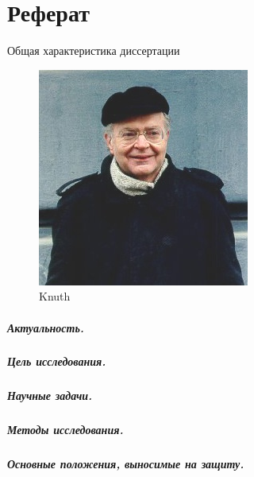 \chapter*{Реферат}

\begin{center}
    Общая характеристика диссертации
\end{center}

\begin{figure}
    \centering
    \includegraphics[width=0.6\linewidth]{images/knuth}
    \caption{Knuth}
    \label{fig:my_label2}
\end{figure}



\paragraph*{Актуальность.}

\paragraph*{Цель исследования.}
\paragraph*{Научные задачи.}

\paragraph*{Методы исследования.}


\paragraph*{Основные положения, выносимые на защиту.}
